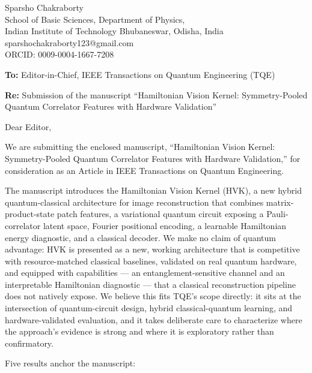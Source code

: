 \documentclass[11pt]{article}
\begin{document}
\begin{flushright}
Sparsho Chakraborty \\
School of Basic Sciences, Department of Physics, \\
Indian Institute of Technology Bhubaneswar, Odisha, India \\
sparshochakraborty123@gmail.com \\
ORCID: 0009-0004-1667-7208
\end{flushright}

\bigskip
\noindent \textbf{To:} Editor-in-Chief, IEEE Transactions on Quantum Engineering (TQE)

\bigskip
\noindent \textbf{Re:} Submission of the manuscript ``Hamiltonian Vision Kernel: Symmetry-Pooled Quantum Correlator Features with Hardware Validation''

\bigskip
\noindent Dear Editor,

\smallskip
\noindent We are submitting the enclosed manuscript, ``Hamiltonian Vision Kernel: Symmetry-Pooled Quantum Correlator Features with Hardware Validation,'' for consideration as an Article in IEEE Transactions on Quantum Engineering.

\smallskip
\noindent The manuscript introduces the Hamiltonian Vision Kernel (HVK), a new hybrid quantum-classical architecture for image reconstruction that combines matrix-product-state patch features, a variational quantum circuit exposing a Pauli-correlator latent space, Fourier positional encoding, a learnable Hamiltonian energy diagnostic, and a classical decoder. We make no claim of quantum advantage: HVK is presented as a new, working architecture that is competitive with resource-matched classical baselines, validated on real quantum hardware, and equipped with capabilities --- an entanglement-sensitive channel and an interpretable Hamiltonian diagnostic --- that a classical reconstruction pipeline does not natively expose. We believe this fits TQE's scope directly: it sits at the intersection of quantum-circuit design, hybrid classical-quantum learning, and hardware-validated evaluation, and it takes deliberate care to characterize where the approach's evidence is strong and where it is exploratory rather than confirmatory.

\smallskip
\noindent Five results anchor the manuscript:
\end{document}
